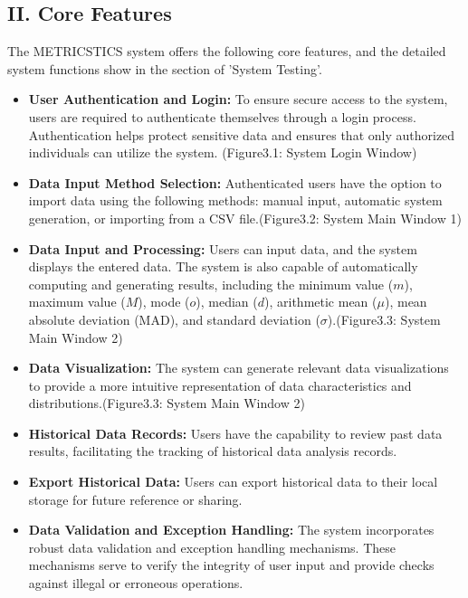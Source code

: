 \documentclass[english,12pt,a4paper]{report}
\begin{document}
		\subsection*{II. Core Features}
		
		The METRICSTICS system offers the following core features, and the detailed system functions show in the section of 'System Testing'.  
			\begin{itemize}[leftmargin=*]
				
			\item \textbf{User Authentication and Login:} To ensure secure access to the system, users are required to authenticate themselves through a login process. Authentication helps protect sensitive data and ensures that only authorized individuals can utilize the system.	(Figure3.1: System Login Window)
			
			\item \textbf{Data Input Method Selection:} Authenticated users have the option to import data using the following methods: manual input, automatic system generation, or importing from a CSV file.(Figure3.2: System Main Window 1)
			
			\item \textbf{Data Input and Processing:} Users can input data, and the system displays the entered data. The system is also capable of automatically computing and generating results, including the minimum value ($m$), maximum value ($M$), mode ($o$), median ($d$), arithmetic mean ($\mu$), mean absolute deviation (MAD), and standard deviation ($\sigma$).(Figure3.3: System Main Window 2)
			
			\item \textbf{Data Visualization:} The system can generate relevant data visualizations to provide a more intuitive representation of data characteristics and distributions.(Figure3.3: System Main Window 2)
			
			\item \textbf{Historical Data Records:} Users have the capability to review past data results, facilitating the tracking of historical data analysis records.
			
			\item \textbf{Export Historical Data:} Users can export historical data to their local storage for future reference or sharing.
			
			\item \textbf{Data Validation and Exception Handling:} The system incorporates robust data validation and exception handling mechanisms. These mechanisms serve to verify the integrity of user input and provide checks against illegal or erroneous operations.
		\end{itemize}
\end{document}
